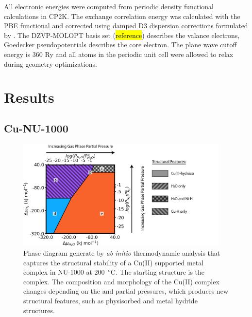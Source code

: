 \documentclass[journal=jctcce,manuscript=article]{achemso}
\begin{document}
All electronic energies were computed from periodic density functional calculations in CP2K.\cite{Hutter2014} The exchange correlation energy was calculated with the PBE functional\cite{Perdew1996} and corrected using damped D3 dispersion corrections formulated by \citeauthor{Grimme2010}.\cite{Grimme2010} The DZVP-MOLOPT basis set (\hl{reference}) describes the valance electrons, Goedecker pseudopotentials\cite{Goedecker1996} describes the core electron. The plane wave cutoff energy is 360 Ry and  all atoms in the periodic unit cell were allowed to relax during geometry optimizations. 

\newpage
\section{Results}
\subsection{Cu-NU-1000}

\begin{figure}[H]
    \centering
    \includegraphics[width=0.95\textwidth]{zi-images/02-Cu-Graphics/2020-08-05-Cu3-phase-diagram-V01.png}
    \caption{Phase diagram generate by \textit{ab initio} thermodynamic analysis that captures the structural stability of a Cu(II) supported metal complex in NU-1000 at \SI{200}{\celsius}. The starting structure is the  complex. The composition and morphology of the Cu(II) complex changes depending on the  and  partial pressures, which produces new structural features, such as physisorbed  and metal hydride structures.}
    \label{fig:phasediagramCu3}
\end{figure}
\end{document}
